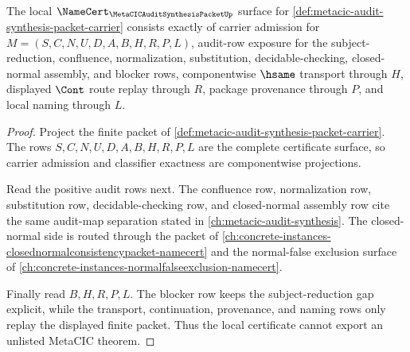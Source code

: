 \begin{theorem}
\label{thm:metacic-audit-synthesis-certificate-surface}
The local $\NameCert_{\MetaCICAuditSynthesisPacketUp}$ surface for \autoref{def:metacic-audit-synthesis-packet-carrier} consists exactly of carrier admission for $M=(S,C,N,U,D,A,B,H,R,P,L)$, audit-row exposure for the subject-reduction, confluence, normalization, substitution, decidable-checking, closed-normal assembly, and blocker rows, componentwise $\hsame$ transport through $H$, displayed $\Cont$ route replay through $R$, package provenance through $P$, and local naming through $L$.
\end{theorem}
\begin{proof}
Project the finite packet of \autoref{def:metacic-audit-synthesis-packet-carrier}. The rows $S,C,N,U,D,A,B,H,R,P,L$ are the complete certificate surface, so carrier admission and classifier exactness are componentwise projections.

Read the positive audit rows next. The confluence row, normalization row, substitution row, decidable-checking row, and closed-normal assembly row cite the same audit-map separation stated in \autoref{ch:metacic-audit-synthesis}. The closed-normal side is routed through the packet of \autoref{ch:concrete-instances-closednormalconsistencypacket-namecert} and the normal-false exclusion surface of \autoref{ch:concrete-instances-normalfalseexclusion-namecert}.

Finally read $B,H,R,P,L$. The blocker row keeps the subject-reduction gap explicit, while the transport, continuation, provenance, and naming rows only replay the displayed finite packet. Thus the local certificate cannot export an unlisted MetaCIC theorem.
\end{proof}

